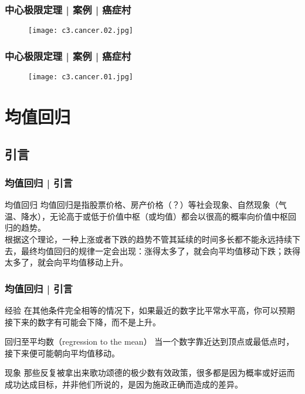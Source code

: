 \begin{frame}
  \frametitle{中心极限定理 | 案例 | 癌症村}
  \begin{figure}
    \centering
    \texttt{[image: c3.cancer.02.jpg]}
  \end{figure}
\end{frame}

\begin{frame}
  \frametitle{中心极限定理 | 案例 | 癌症村}
  \begin{figure}
    \centering
    \texttt{[image: c3.cancer.01.jpg]}
  \end{figure}
\end{frame}

\section{均值回归}
\subsection{引言}
\begin{frame}
  \frametitle{均值回归 | 引言}
  \begin{block}{均值回归}
    均值回归是指股票价格、房产价格\alert{（？）}等社会现象、自然现象（气温、降水），无论高于或低于价值中枢（或均值）都会以很高的概率向价值中枢回归的趋势。\\
    \vspace{1em}
根据这个理论，一种上涨或者下跌的趋势不管其延续的时间多长都不能永远持续下去，最终均值回归的规律一定会出现：涨得太多了，就会向平均值移动下跌；跌得太多了，就会向平均值移动上升。
  \end{block}
\end{frame}

\begin{frame}
  \frametitle{均值回归 | 引言}
  \begin{block}{经验}
    在其他条件完全相等的情况下，如果最近的数字比平常水平高，你可以预期接下来的数字有可能会下降，而不是上升。
  \end{block}
  \pause
  \begin{block}{回归至平均数（regression to the mean）}
    当一个数字靠近达到顶点或最低点时，接下来便可能朝向平均值移动。
  \end{block}
  \pause
  \begin{block}{现象}
    那些反复被拿出来歌功颂德的极少数有效政策，很多都是因为概率或好运而成功达成目标，并非他们所说的，是因为施政正确而造成的差异。
  \end{block}
\end{frame}

